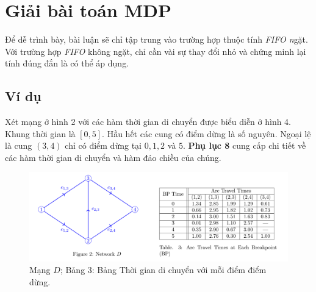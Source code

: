 \documentclass[../main.tex]{subfiles}
\begin{document}
\chapter{Giải bài toán MDP}\label{giux1ea3i-buxe0i-touxe1n-mdp}

Để dễ trình bày, bài luận sẽ chỉ tập trung vào trường hợp thuộc tính
\emph{FIFO n}gặt. Với trường hợp \emph{FIFO} không ngặt, chỉ cần vài sự
thay đổi nhỏ và chứng minh lại tính đúng đắn là có thể áp dụng.

\section{Ví dụ}\label{vuxed-dux1ee5}

Xét mạng ở hình 2 với các hàm thời gian di chuyển được biểu diễn ở hình
4. Khung thời gian là \([0, 5]\). Hầu hết các cung có điểm dừng là số
nguyên. Ngoại lệ là cung \((3, 4)\) chỉ có điểm dừng tại \(0, 1, 2\) và
\(5\). \textbf{Phụ lục 8} cung cấp chi tiết về các hàm thời gian di
chuyển và hàm đảo chiều của chúng.



\begin{figure}
\centering
\includegraphics{images/Figure2.png}
\caption{Mạng \(D\); Bảng 3: Bảng Thời gian di chuyển với mỗi
điểm điểm dừng.}
\label{fig:2}
\end{figure}
\end{document}
